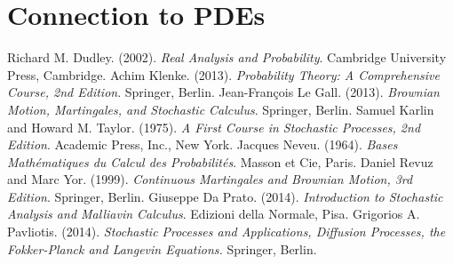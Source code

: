 \documentclass{article}
\numberwithin{equation}{section}
\theoremstyle{plain}
\theoremstyle{definition}
\begin{document}
\section{Connection to PDEs}
\newpage
\begin{thebibliography}{100}
 Richard M. Dudley. (2002). \textit{Real Analysis and Probability}. Cambridge University Press, Cambridge.
 Achim Klenke. (2013). \textit{Probability Theory: A Comprehensive Course, 2nd Edition}. Springer, Berlin.
 Jean-François Le Gall. (2013). \textit{Brownian Motion, Martingales, and Stochastic Calculus}. Springer, Berlin.
 Samuel Karlin and Howard M. Taylor. (1975). \textit{A First Course in Stochastic Processes, 2nd Edition}. Academic Press, Inc., New York.
 Jacques Neveu. (1964). \textit{Bases Mathématiques du 
Calcul des Probabilités}. Masson et Cie, Paris.
 Daniel Revuz and Marc Yor. (1999). \textit{Continuous Martingales 
and Brownian Motion, 3rd Edition}. Springer, Berlin.
 Giuseppe Da Prato. (2014). \textit{Introduction to Stochastic Analysis and Malliavin Calculus}. Edizioni della Normale, Pisa.
 Grigorios A. Pavliotis. (2014). \textit{Stochastic Processes and Applications, Diffusion Processes, the Fokker-Planck and Langevin Equations.} Springer, Berlin.
\end{thebibliography}
\end{document}

